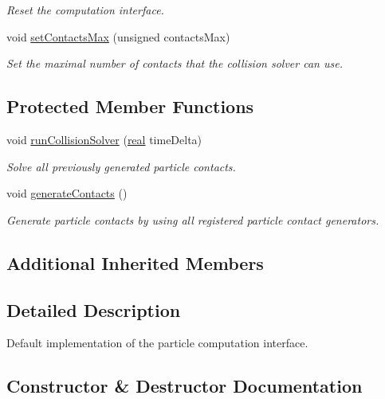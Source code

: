 \begin{DoxyCompactItemize}
\begin{DoxyCompactList}\small\item\em Reset the computation interface. \end{DoxyCompactList}\item 
void \mbox{\hyperlink{classr3_1_1_default_particle_engine_c_i_a7dbb49cbf2f5b028656ea2e14174a3ed}{set\+Contacts\+Max}} (unsigned contacts\+Max)
\begin{DoxyCompactList}\small\item\em Set the maximal number of contacts that the collision solver can use. \end{DoxyCompactList}\end{DoxyCompactItemize}
\subsection*{Protected Member Functions}
\begin{DoxyCompactItemize}
\item 
void \mbox{\hyperlink{classr3_1_1_default_particle_engine_c_i_a19138f7707e948b7e8e05647bcba52fe}{run\+Collision\+Solver}} (\mbox{\hyperlink{namespacer3_ab2016b3e3f743fb735afce242f0dc1eb}{real}} time\+Delta)
\begin{DoxyCompactList}\small\item\em Solve all previously generated particle contacts. \end{DoxyCompactList}\item 
void \mbox{\hyperlink{classr3_1_1_default_particle_engine_c_i_a61aea4f32cc73960915d3c68396bd47e}{generate\+Contacts}} ()
\begin{DoxyCompactList}\small\item\em Generate particle contacts by using all registered particle contact generators. \end{DoxyCompactList}\end{DoxyCompactItemize}
\subsection*{Additional Inherited Members}


\subsection{Detailed Description}
Default implementation of the particle computation interface. 

\subsection{Constructor \& Destructor Documentation}
\mbox{\label{classr3_1_1_default_particle_engine_c_i_a5f7619a5dd227d681d5dcbde6e8368eb}} 
